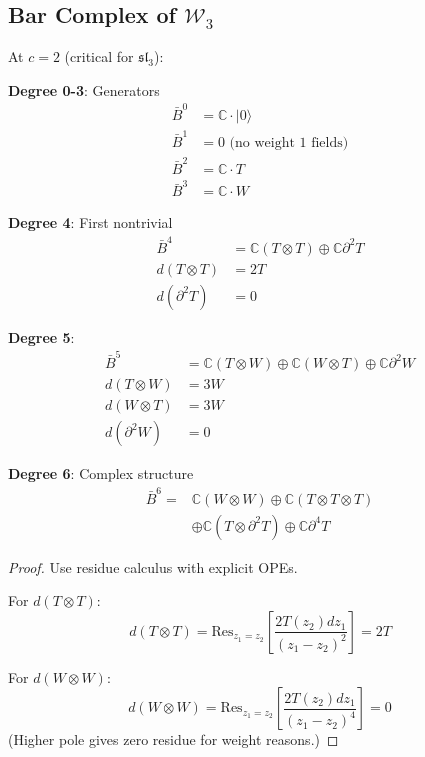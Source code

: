 \subsection{Bar Complex of $\mathcal{W}_3$}

\begin{theorem}
At $c = 2$ (critical for $\mathfrak{sl}_3$):

\textbf{Degree 0-3}: Generators
\begin{align}
\bar{B}^0 &= \mathbb{C} \cdot |0\rangle \\
\bar{B}^1 &= 0 \text{ (no weight 1 fields)} \\
\bar{B}^2 &= \mathbb{C} \cdot T \\
\bar{B}^3 &= \mathbb{C} \cdot W
\end{align}

\textbf{Degree 4}: First nontrivial
\begin{align}
\bar{B}^4 &= \mathbb{C}(T \otimes T) \oplus \mathbb{C}\partial^2T \\
d(T \otimes T) &= 2T \\
d(\partial^2T) &= 0
\end{align}

\textbf{Degree 5}:
\begin{align}
\bar{B}^5 &= \mathbb{C}(T \otimes W) \oplus \mathbb{C}(W \otimes T) \oplus \mathbb{C}\partial^2W \\
d(T \otimes W) &= 3W \\
d(W \otimes T) &= 3W \\
d(\partial^2W) &= 0
\end{align}

\textbf{Degree 6}: Complex structure
\begin{align}
\bar{B}^6 = &\mathbb{C}(W \otimes W) \oplus \mathbb{C}(T \otimes T \otimes T) \\
&\oplus \mathbb{C}(T \otimes \partial^2T) \oplus \mathbb{C}\partial^4T
\end{align}
\end{theorem}

\begin{proof}
Use residue calculus with explicit OPEs.

For $d(T \otimes T)$:
$$d(T \otimes T) = \text{Res}_{z_1=z_2}\left[\frac{2T(z_2)dz_1}{(z_1-z_2)^2}\right] = 2T$$

For $d(W \otimes W)$:
$$d(W \otimes W) = \text{Res}_{z_1=z_2}\left[\frac{2T(z_2)dz_1}{(z_1-z_2)^4}\right] = 0$$
(Higher pole gives zero residue for weight reasons.)
\end{proof}

